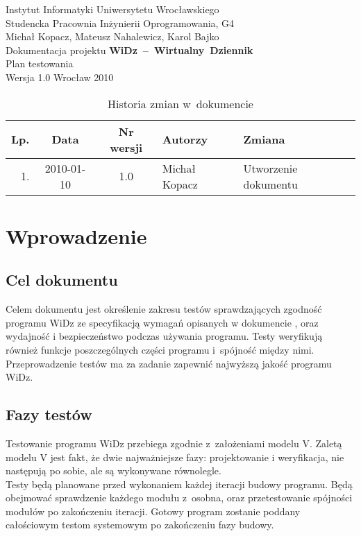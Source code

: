\documentclass[12pt,leqno,twoside]{mwart}
\begin{document}
\begin{titlepage}
\begin{center}
Instytut Informatyki Uniwersytetu Wrocławskiego \\
Studencka Pracownia Inżynierii Oprogramowania, G4 \\
\vspace{4cm}
\Large Michał Kopacz, Mateusz Nahalewicz, Karol Bajko \\
\vspace{0.5cm}
\huge Dokumentacja projektu \mbox{\textbf{WiDz -- Wirtualny Dziennik}} \\ \Large Plan testowania\\
\vspace{1cm}
\normalsize Wersja 1.0
\vfill
\normalsize Wrocław 2010
\end{center}
\end{titlepage}

\newpage

\begin{table}
	\centering
	\caption{Historia zmian w~dokumencie}
		\begin{tabular}{|r|c|c|l|l|}
		\hline
		Lp. 	& Data       & Nr wersji 	& Autorzy           		& Zmiana \\ \hline
		1.   	& 2010-01-10 & 1.0       	& Michał Kopacz & Utworzenie dokumentu \\ \hline
		\end{tabular}
\end{table}

\newpage

\tableofcontents

\newpage

\section{Wprowadzenie}
\subsection{Cel dokumentu}
\noindent Celem dokumentu jest określenie zakresu testów sprawdzających zgodność programu WiDz ze specyfikacją wymagań opisanych w dokumencie \cite{WYM}, oraz wydajność i bezpieczeństwo podczas używania programu. Testy weryfikują również funkcje poszczególnych części programu i~spójność między nimi. Przeprowadzenie testów ma za zadanie zapewnić najwyższą jakość programu WiDz. \\
\subsection{Fazy testów}
\noindent Testowanie programu WiDz przebiega zgodnie z~założeniami modelu V. Zaletą modelu V jest fakt, że dwie najważniejsze fazy: projektowanie i weryfikacja, nie następują po sobie, ale są wykonywane równolegle. \\
\indent Testy będą planowane przed wykonaniem każdej iteracji budowy programu. Będą obejmować sprawdzenie każdego modułu z~osobna, oraz przetestowanie spójności modułów po zakończeniu iteracji. Gotowy program zostanie poddany całościowym testom systemowym po zakończeniu fazy budowy.
\end{document}
